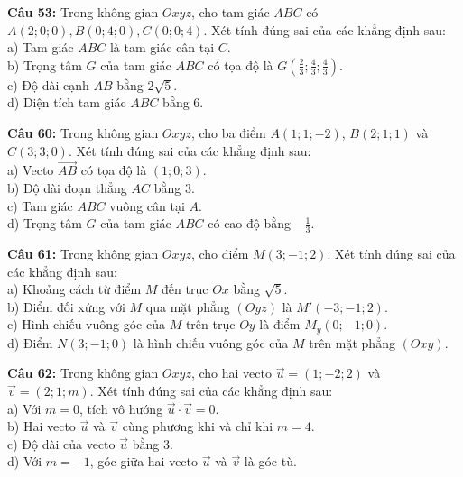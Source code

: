 \documentclass[12pt]{article}
\begin{document}
	\vspace{4mm}
	\noindent \textbf{Câu 53:} Trong không gian $Oxyz$, cho tam giác $ABC$ có $A(2; 0; 0), B(0; 4; 0), C(0; 0; 4)$. Xét tính đúng sai của các khẳng định sau: \\
	\noindent a) Tam giác $ABC$ là tam giác cân tại $C$. \\
	\noindent b) Trọng tâm $G$ của tam giác $ABC$ có tọa độ là $G\left(\frac{2}{3}; \frac{4}{3}; \frac{4}{3}\right)$. \\
	\noindent c) Độ dài cạnh $AB$ bằng $2\sqrt{5}$. \\
	\noindent d) Diện tích tam giác $ABC$ bằng $6$.
	
	\vspace{4mm}
	\noindent \textbf{Câu 60:} Trong không gian $Oxyz$, cho ba điểm $A(1; 1; -2)$, $B(2; 1; 1)$ và $C(3; 3; 0)$. Xét tính đúng sai của các khẳng định sau: \\
	\noindent a) Vecto $\vec{AB}$ có tọa độ là $(1; 0; 3)$. \\
	\noindent b) Độ dài đoạn thẳng $AC$ bằng $3$. \\
	\noindent c) Tam giác $ABC$ vuông cân tại $A$. \\
	\noindent d) Trọng tâm $G$ của tam giác $ABC$ có cao độ bằng $-\frac{1}{3}$.
	
	\vspace{4mm}
	\noindent \textbf{Câu 61:} Trong không gian $Oxyz$, cho điểm $M(3; -1; 2)$. Xét tính đúng sai của các khẳng định sau: \\
	\noindent a) Khoảng cách từ điểm $M$ đến trục $Ox$ bằng $\sqrt{5}$. \\
	\noindent b) Điểm đối xứng với $M$ qua mặt phẳng $(Oyz)$ là $M'(-3; -1; 2)$. \\
	\noindent c) Hình chiếu vuông góc của $M$ trên trục $Oy$ là điểm $M_y(0; -1; 0)$. \\
	\noindent d) Điểm $N(3; -1; 0)$ là hình chiếu vuông góc của $M$ trên mặt phẳng $(Oxy)$.
	
	\vspace{4mm}
	\noindent \textbf{Câu 62:} Trong không gian $Oxyz$, cho hai vecto $\vec{u} = (1; -2; 2)$ và $\vec{v} = (2; 1; m)$. Xét tính đúng sai của các khẳng định sau: \\
	\noindent a) Với $m = 0$, tích vô hướng $\vec{u} \cdot \vec{v} = 0$. \\
	\noindent b) Hai vecto $\vec{u}$ và $\vec{v}$ cùng phương khi và chỉ khi $m = 4$. \\
	\noindent c) Độ dài của vecto $\vec{u}$ bằng $3$. \\
	\noindent d) Với $m = -1$, góc giữa hai vecto $\vec{u}$ và $\vec{v}$ là góc tù.
	
\end{document}
